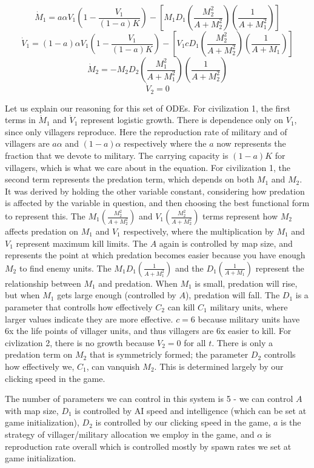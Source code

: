 \documentclass[12pt]{article}
\begin{document}
$$\dot M_1=a \alpha V_1(1-\frac{V_1}{(1-a)K})-[M_1D_1(\frac{M_2^2}{A+M_2^2})(\frac{1}{A+M_1^2})]$$
$$\dot V_1=(1 - a) \alpha V_1(1-\frac{V_1}{(1-a)K})-[V_1cD_1(\frac{M_2^2}{A+M_2^2})(\frac{1}{A +M_1})]$$
$$\dot M_2=-M_2 D_2(\frac{M_1^2}{A+M_1^2})(\frac{1}{A +M_2^2}) $$
$$\dot V_2 = 0 $$

Let us explain our reasoning for this set of ODEs. For civilization 1, the first terms in $\dot M_1$ and $\dot V_1$ represent logistic growth. There is dependence only on $V_1$, since only villagers reproduce. Here the reproduction rate of military and of villagers are $a \alpha$ and $(1 - a) \alpha$ respectively where the $a$ now represents the fraction that we devote to military. The carrying capacity is $(1-a)K$ for villagers, which is what we care about in the equation. For civilization 1, the second term represents the predation term, which depends on both $M_1$ and $M_2$. It was derived by holding the other variable constant, considering how predation is affected by the variable in question, and then choosing the best functional form to represent this. The $M_1 (\frac{M_2^2}{A+M_2^2})$ and $V_1 (\frac{M_2^2}{A+M_2^2})$ terms represent how $M_2$ affects predation on $M_1$ and $V_1$ respectively, where the multiplication by $M_1$ and $V_1$ represent maximum kill limits. The $A$ again is controlled by map size, and represents the point at which predation becomes easier because you have enough $M_2$ to find enemy units. The $M_1 D_1 (\frac{1}{A+M_1^2})$ and the $D_1 (\frac{1}{A +M_1})$ represent the relationship between $M_1$ and predation. When $M_1$ is small, predation will rise, but when $M_1$ gets large enough (controlled by $A$), predation will fall. The $D_1$ is a parameter that controlls how effectively $C_2$ can kill $C_1$ military units, where larger values indicate they are more effective. $c = 6$ because military units have 6x the life points of villager units, and thus villagers are 6x easier to kill. For civlization 2, there is no growth because $V_2 = 0$ for all $t$. There is only a predation term on $M_2$ that is symmetricly formed; the parameter $D_2$ controlls how effectively we, $C_1$, can vanquish $M_2$. This is determined largely by our clicking speed in the game. \par
The number of parameters we can control in this system is 5 - we can control $A$ with map size, $D_1$ is controlled by AI speed and intelligence (which can be set at game initialization), $D_2$ is controlled by our clicking speed in the game, $a$ is the strategy of villager/military allocation we employ in the game, and $\alpha$ is reproduction rate overall which is controlled mostly by spawn rates we set at game initialization.
\end{document}
